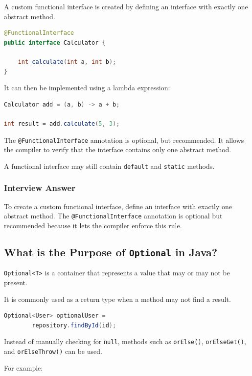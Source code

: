 \documentclass[12pt,a4paper]{article}
\begin{document}
A custom functional interface is created by defining an interface with
exactly one abstract method.

\begin{lstlisting}[language=Java]
@FunctionalInterface
public interface Calculator {

    int calculate(int a, int b);
}
\end{lstlisting}

It can then be implemented using a lambda expression:

\begin{lstlisting}[language=Java]
Calculator add = (a, b) -> a + b;

int result = add.calculate(5, 3);
\end{lstlisting}

The \texttt{@FunctionalInterface} annotation is optional, but recommended.
It allows the compiler to verify that the interface contains only one
abstract method.

A functional interface may still contain \texttt{default} and
\texttt{static} methods.

\subsubsection*{Interview Answer}

To create a custom functional interface, define an interface with exactly
one abstract method. The \texttt{@FunctionalInterface} annotation is
optional but recommended because it lets the compiler enforce this rule.

\subsection{What is the Purpose of \texttt{Optional} in Java?}

\texttt{Optional<T>} is a container that represents a value that may or may
not be present.

It is commonly used as a return type when a method may not find a result.

\begin{lstlisting}[language=Java]
Optional<User> optionalUser =
        repository.findById(id);
\end{lstlisting}

Instead of manually checking for \texttt{null}, methods such as
\texttt{orElse()}, \texttt{orElseGet()}, and
\texttt{orElseThrow()} can be used.

For example:
\end{document}
